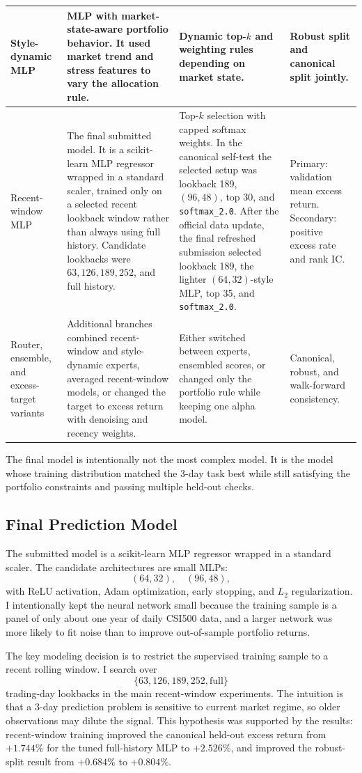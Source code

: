 \documentclass[11pt]{article}
\begin{document}
{\begin{longtable}{p{}p{}p{}p{}}
\midrule
Style-dynamic MLP &
MLP with market-state-aware portfolio behavior. It used market trend and stress
features to vary the allocation rule. &
Dynamic top-\(k\) and weighting rules depending on market state. &
Robust split and canonical split jointly. \\
\midrule
Recent-window MLP &
The final submitted model. It is a scikit-learn MLP regressor wrapped in a
standard scaler, trained only on a selected recent lookback window rather than
always using full history. Candidate lookbacks were \(63,126,189,252\), and
full history. &
Top-\(k\) selection with capped softmax weights. In the canonical self-test the
selected setup was lookback 189, \((96,48)\), top 30, and
\texttt{softmax\_2.0}. After the official data update, the final refreshed
submission selected lookback 189, the lighter \((64,32)\)-style MLP, top 35,
and \texttt{softmax\_2.0}. &
Primary: validation mean excess return. Secondary: positive excess rate and
rank IC. \\
\midrule
Router, ensemble, and excess-target variants &
Additional branches combined recent-window and style-dynamic experts, averaged
recent-window models, or changed the target to excess return with denoising and
recency weights. &
Either switched between experts, ensembled scores, or changed only the
portfolio rule while keeping one alpha model. &
Canonical, robust, and walk-forward consistency. \\
\bottomrule
\end{longtable}
}

The final model is intentionally not the most complex model. It is the model
whose training distribution matched the 3-day task best while still satisfying
the portfolio constraints and passing multiple held-out checks.

\subsection{Final Prediction Model}

The submitted model is a scikit-learn MLP regressor wrapped in a standard
scaler. The candidate architectures are small MLPs:
\[
    (64,32),\quad (96,48),
\]
with ReLU activation, Adam optimization, early stopping, and \(L_2\)
regularization. I intentionally kept the neural network small because the
training sample is a panel of only about one year of daily CSI500 data, and a
larger network was more likely to fit noise than to improve out-of-sample
portfolio returns.

The key modeling decision is to restrict the supervised training sample to a
recent rolling window. I search over
\[
    \{63,126,189,252,\text{full}\}
\]
trading-day lookbacks in the main recent-window experiments. The intuition is
that a 3-day prediction problem is sensitive to current market regime, so older
observations may dilute the signal. This hypothesis was supported by the
results: recent-window training improved the canonical held-out excess return
from \(+1.744\%\) for the tuned full-history MLP to \(+2.526\%\), and improved
the robust-split result from \(+0.684\%\) to \(+0.804\%\).
\end{document}
